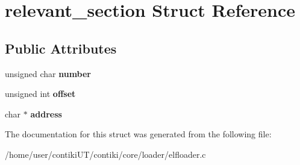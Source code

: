 \hypertarget{structrelevant__section}{}\section{relevant\+\_\+section Struct Reference}
\label{structrelevant__section}
\subsection*{Public Attributes}
\begin{DoxyCompactItemize}
\item 
\hypertarget{structrelevant__section_af3b75eb76427c9923ab40ed8f6e50edb}{}unsigned char {\bfseries number}\label{structrelevant__section_af3b75eb76427c9923ab40ed8f6e50edb}

\item 
\hypertarget{structrelevant__section_a6992b7c05722e0d206129da9b7ff9665}{}unsigned int {\bfseries offset}\label{structrelevant__section_a6992b7c05722e0d206129da9b7ff9665}

\item 
\hypertarget{structrelevant__section_a679cf0bd66f85813807abb86fb80afe5}{}char $\ast$ {\bfseries address}\label{structrelevant__section_a679cf0bd66f85813807abb86fb80afe5}

\end{DoxyCompactItemize}


The documentation for this struct was generated from the following file\+:\begin{DoxyCompactItemize}
\item 
/home/user/contiki\+U\+T/contiki/core/loader/elfloader.\+c\end{DoxyCompactItemize}
